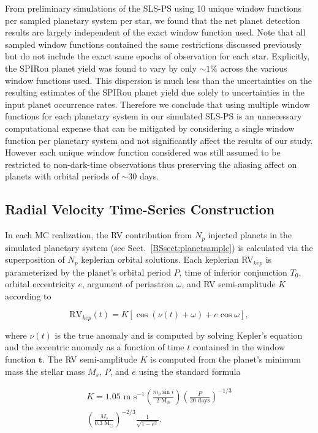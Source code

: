 From preliminary simulations of the SLS-PS using 10 unique window functions per sampled planetary system per star,
we found that the net planet detection results are largely independent of the exact window function used. Note that
all sampled window functions contained the same restrictions discussed previously but do not include the exact
same epochs of observation for each star. Explicitly,
the SPIRou planet yield was found to vary by only $\sim 1$\% across the various window functions used.
This dispersion is much
less than the uncertainties on the resulting estimates of the SPIRou planet yield due solely to uncertainties in
the input planet occurrence rates. Therefore we conclude that using multiple window functions for each planetary
system in our simulated
SLS-PS is an unnecessary computational expense that can be mitigated by considering a single window function
per planetary system and not significantly affect the results of our study. However each unique window function considered
was still assumed to be restricted to non-dark-time observations thus preserving the aliasing affect on planets with
orbital periods of $\sim 30$ days.


\subsection{Radial Velocity Time-Series Construction} \label{BSsect:timeseries}
In each MC realization, 
the RV contribution from $N_p$ injected planets in the simulated planetary system (see Sect.~\ref{BSsect:planetsample})
is calculated via the superposition of $N_p$ keplerian orbital solutions. Each keplerian RV$_{kep}$ is parameterized by
the planet's orbital period $P$, time of inferior conjunction $T_0$, orbital eccentricity $e$,
argument of periastron $\omega$, and RV semi-amplitude $K$ according to

\begin{equation}
 \text{RV}_{kep}(t) = K [\cos{(\nu(t) +\omega)} + e \cos{\omega}],
\end{equation}

\noindent where $\nu(t)$ is the true anomaly and is computed by solving Kepler's equation
and the eccentric anomaly as a function of time $t$ contained in the window function
$\mathbf{t}$. The RV semi-amplitude $K$ is computed from the planet's minimum mass
\msini{,} the stellar mass $M_s$, $P$, and $e$ using the standard formula

\begin{multline}
  K = 1.05 \text{ m s}^{-1} \left(\frac{m_p\sin{i}}{2\text{ M}_{\oplus}} \right)
  \left( \frac{P}{20 \text{ days}} \right)^{-1/3} \\
  \left( \frac{M_s}{0.3 \text{ M}_{\odot}} \right)^{-2/3}
  \frac{1}{\sqrt{1-e^2}}.
\end{multline}

